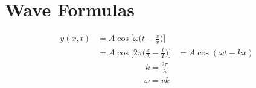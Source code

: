 \chapter{Wave Formulas}

     \begin{align*}
        y(x, t) &= A\cos\bigg[\omega\bigg(t - \frac{x}{v}\bigg)\bigg] \\
                &= A\cos\bigg[2\pi\bigg(\frac{x}{\lambda} - \frac{t}{T}\bigg)\bigg]
                &= A\cos(\omega t - kx)
     \end{align*}
    \begin{align*}
      k = \frac{2\pi}{\lambda}
    \end{align*}
    \begin{align*}
      \omega = vk
    \end{align*}
